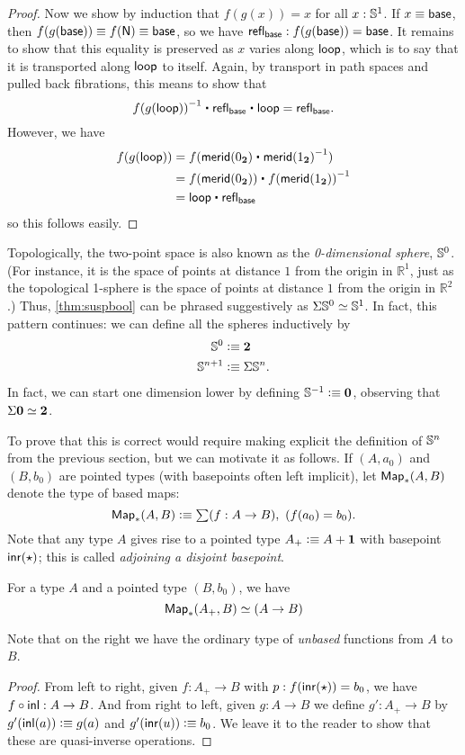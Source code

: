 \begin{proof}
  Now we show by induction that $f(g(x))=x$ for all $x:\mathbb{S}^1$.
  If $x\equiv \mathsf{base}$, then $f(g(\mathsf{base}))\equiv f(\mathsf{N})\equiv\mathsf{base}$, so we have $\mathsf{refl}_{\mathsf{base}} : f(g(\mathsf{base}))=\mathsf{base}$.
  It remains to show that this equality is preserved as $x$ varies along $\mathsf{loop}$, which is to say that it is transported along $\mathsf{loop}$ to itself.
  Again, by transport in path spaces and pulled back fibrations, this means to show that
  \[ \opp{\ap f {\ap g {\lloop}}} \ct \refl{\base} \ct \lloop = \refl{\base}.\]
  However, we have
  \begin{align*}
    \ap f {\ap g {\lloop}} &= \ap f {\merid(\bfalse) \ct \opp{\merid(\btrue)}}\\
    &= \ap f {\merid(\bfalse)} \ct \opp{\ap f {\merid(\btrue)}}\\
    &= \lloop \ct \refl{\base}
  \end{align*}
  so this follows easily.
\end{proof}

Topologically, the two-point space \bool is also known as the \emph{0-dimensional sphere}, $\mathbb{S}^0$.
(For instance, it is the space of points at distance $1$ from the origin in $\mathbb{R}^1$, just as the topological 1-sphere is the space of points at distance $1$ from the origin in $\mathbb{R}^2$.)
Thus, \autoref{thm:suspbool} can be phrased suggestively as $\Sigma\mathbb{S}^0 \simeq \mathbb{S}^1$.
In fact, this pattern continues: we can define all the spheres inductively by
\begin{equation}\label{eq:Snsusp}
\begin{split}
  \Sn^0 &\defeq \bool\\
  \Sn^{n+1} &\defeq \susp \Sn^n.
\end{split}
\end{equation}
In fact, we can start one dimension lower by defining $\mathbb{S}^{-1}\vcentcolon\equiv \mathbf{0}$, observing that $\Sigma\mathbf{0} \simeq \mathbf{2}$.

To prove that this is correct would require making explicit the definition of $\mathbb{S}^n$ from the previous section, but we can motivate it as follows.
If $(A,a_0)$ and $(B,b_0)$ are pointed types (with basepoints often left implicit), let $\mathsf{Map}_*(A,B)$ denote the type of based maps:
\[ \Map_*(A,B) \defeq \sm{f:A\to B} (f(a_0)=b_0). \]
Note that any type $A$ gives rise to a pointed type $A_+ \vcentcolon\equiv A+\mathbf{1}$ with basepoint $\mathsf{inr}(\star)$; this is called \emph{adjoining a disjoint basepoint}.

\begin{lem}
  For a type $A$ and a pointed type $(B,b_0)$, we have
  \[ \mathsf{Map}_*(A_+,B) \simeq (A\to B) \]
\end{lem}
Note that on the right we have the ordinary type of \emph{unbased} functions from $A$ to $B$.
\begin{proof}
  From left to right, given $f:A_+ \to B$ with $p:f(\mathsf{inr}(\star)) = b_0$, we have $f\circ \mathsf{inl} : A \to B$.
  And from right to left, given $g:A\to B$ we define $g':A_+ \to B$ by $g'(\mathsf{inl}(a))\vcentcolon\equiv g(a)$ and $g'(\mathsf{inr}(u)) \vcentcolon\equiv b_0$.
  We leave it to the reader to show that these are quasi-inverse operations.
\end{proof}

